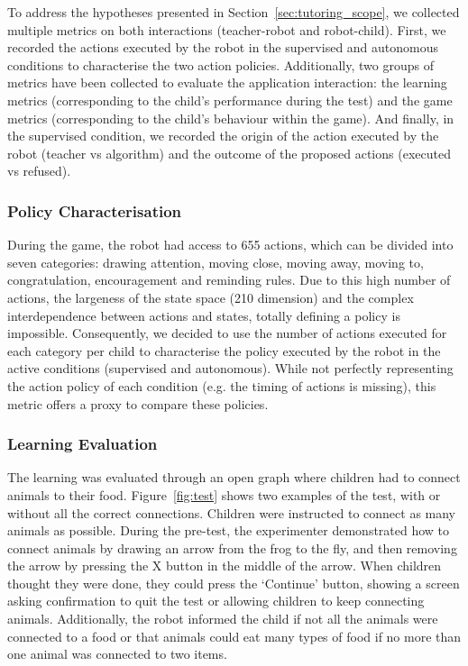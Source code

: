 To address the hypotheses presented in Section~\ref{sec:tutoring_scope}, we collected multiple metrics on both interactions (teacher-robot and robot-child). First, we recorded the actions executed by the robot in the supervised and autonomous conditions to characterise the two action policies. Additionally, two groups of metrics have been collected to evaluate the application interaction: the learning metrics (corresponding to the child's performance during the test) and the game metrics (corresponding to the child's behaviour within the game). And finally, in the supervised condition, we recorded the origin of the action executed by the robot (teacher vs algorithm) and the outcome of the proposed actions (executed vs refused).

\subsubsection{Policy Characterisation}

During the game, the robot had access to 655 actions, which can be divided into seven categories: drawing attention, moving close, moving away, moving to, congratulation, encouragement and reminding rules. Due to this high number of actions, the largeness of the state space (210 dimension) and the complex interdependence between actions and states, totally defining a policy is impossible. Consequently, we decided to use the number of actions executed for each category per child to characterise the policy executed by the robot in the active conditions (supervised and autonomous). While not perfectly representing the action policy of each condition (e.g. the timing of actions is missing), this metric offers a proxy to compare these policies. 

\subsubsection{Learning Evaluation}
The learning was evaluated through an open graph where children had to connect animals to their food. Figure~\ref{fig:test} shows two examples of the test, with or without all the correct connections. Children were instructed to connect as many animals as possible. During the pre-test, the experimenter demonstrated how to connect animals by drawing an arrow from the frog to the fly, and then removing the arrow by pressing the X button in the middle of the arrow. When children thought they were done, they could press the `Continue' button, showing a screen asking confirmation to quit the test or allowing children to keep connecting animals. Additionally, the robot informed the child if not all the animals were connected to a food or that animals could eat many types of food if no more than one animal was connected to two items. 

